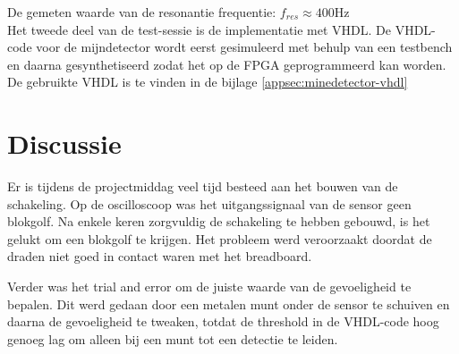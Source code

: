\documentclass{report}
\begin{document}
\noindent De gemeten waarde van de resonantie frequentie:
$f_{res}\approx400 \mathrm{Hz}$\\

\noindent Het tweede deel van de test-sessie is de implementatie met VHDL. De VHDL-code voor de mijndetector wordt eerst gesimuleerd met behulp van een testbench en daarna gesynthetiseerd zodat het op de FPGA geprogrammeerd kan worden. De gebruikte VHDL is te vinden in de bijlage \ref{appsec:minedetector-vhdl}

\section{Discussie}
Er is tijdens de projectmiddag veel tijd besteed aan het bouwen van de schakeling. Op de oscilloscoop was het uitgangssignaal van de sensor geen blokgolf. Na enkele keren zorgvuldig de schakeling te hebben gebouwd, is het gelukt om een blokgolf te krijgen. Het probleem werd veroorzaakt doordat de draden niet goed in contact waren met het breadboard.

Verder was het trial and error om de juiste waarde van de gevoeligheid te bepalen. Dit werd gedaan door een metalen munt onder de sensor te schuiven en daarna de gevoeligheid te tweaken, totdat de threshold in de VHDL-code hoog genoeg lag om alleen bij een munt tot een detectie te leiden.
\end{document}
